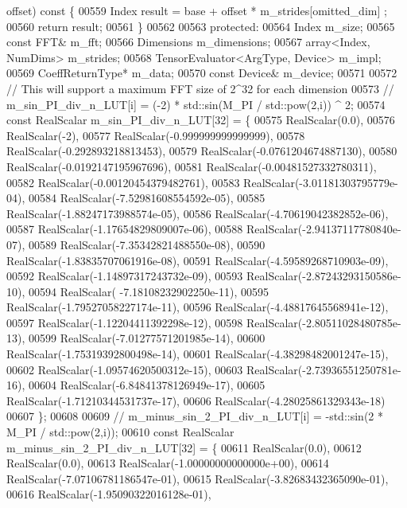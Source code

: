 \begin{DoxyCode}
      offset)\textcolor{keyword}{ const }\{
00559     Index result = base + offset * m\_strides[omitted\_dim] ;
00560     \textcolor{keywordflow}{return} result;
00561   \}
00562 
00563  \textcolor{keyword}{protected}:
00564   Index m\_size;
00565   \textcolor{keyword}{const} FFT& m\_fft;
00566   Dimensions m\_dimensions;
00567   array<Index, NumDims> m\_strides;
00568   TensorEvaluator<ArgType, Device> m\_impl;
00569   CoeffReturnType* m\_data;
00570   \textcolor{keyword}{const} Device& m\_device;
00571 
00572   \textcolor{comment}{// This will support a maximum FFT size of 2^32 for each dimension}
00573   \textcolor{comment}{// m\_sin\_PI\_div\_n\_LUT[i] = (-2) * std::sin(M\_PI / std::pow(2,i)) ^ 2;}
00574   \textcolor{keyword}{const} RealScalar m\_sin\_PI\_div\_n\_LUT[32] = \{
00575     RealScalar(0.0),
00576     RealScalar(-2),
00577     RealScalar(-0.999999999999999),
00578     RealScalar(-0.292893218813453),
00579     RealScalar(-0.0761204674887130),
00580     RealScalar(-0.0192147195967696),
00581     RealScalar(-0.00481527332780311),
00582     RealScalar(-0.00120454379482761),
00583     RealScalar(-3.01181303795779e-04),
00584     RealScalar(-7.52981608554592e-05),
00585     RealScalar(-1.88247173988574e-05),
00586     RealScalar(-4.70619042382852e-06),
00587     RealScalar(-1.17654829809007e-06),
00588     RealScalar(-2.94137117780840e-07),
00589     RealScalar(-7.35342821488550e-08),
00590     RealScalar(-1.83835707061916e-08),
00591     RealScalar(-4.59589268710903e-09),
00592     RealScalar(-1.14897317243732e-09),
00593     RealScalar(-2.87243293150586e-10),
00594     RealScalar( -7.18108232902250e-11),
00595     RealScalar(-1.79527058227174e-11),
00596     RealScalar(-4.48817645568941e-12),
00597     RealScalar(-1.12204411392298e-12),
00598     RealScalar(-2.80511028480785e-13),
00599     RealScalar(-7.01277571201985e-14),
00600     RealScalar(-1.75319392800498e-14),
00601     RealScalar(-4.38298482001247e-15),
00602     RealScalar(-1.09574620500312e-15),
00603     RealScalar(-2.73936551250781e-16),
00604     RealScalar(-6.84841378126949e-17),
00605     RealScalar(-1.71210344531737e-17),
00606     RealScalar(-4.28025861329343e-18)
00607   \};
00608 
00609   \textcolor{comment}{// m\_minus\_sin\_2\_PI\_div\_n\_LUT[i] = -std::sin(2 * M\_PI / std::pow(2,i));}
00610   \textcolor{keyword}{const} RealScalar m\_minus\_sin\_2\_PI\_div\_n\_LUT[32] = \{
00611     RealScalar(0.0),
00612     RealScalar(0.0),
00613     RealScalar(-1.00000000000000e+00),
00614     RealScalar(-7.07106781186547e-01),
00615     RealScalar(-3.82683432365090e-01),
00616     RealScalar(-1.95090322016128e-01),

\end{DoxyCode}
